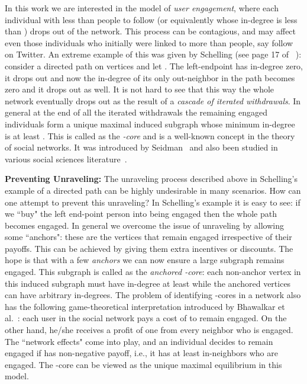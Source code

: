 \documentclass[11pt,a4paper]{article}
\begin{document}
In this work we are interested in the  model of \emph{user engagement}, where each individual with less than  people to
follow (or equivalently whose in-degree is less than ) drops out of the network. This
process can be contagious, and may affect even those individuals who initially were linked to more than  people, say follow
on Twitter. An extreme example of this was given by Schelling (see page 17 of ~\cite{schelling2006micromotives}): consider a
directed path on  vertices and let . The left-endpoint has in-degree zero, it drops out and now the in-degree of its
only out-neighbor in the path becomes zero and it drops out as well. It is not hard to see that this way the whole network
eventually drops out as the result of a \emph{cascade of iterated withdrawals}. In general at the end of all the iterated
withdrawals the remaining engaged individuals form a unique maximal induced subgraph whose minimum in-degree is at least .
This is called as the \emph{-core} and is a well-known concept in the theory of social networks. It was introduced by
Seidman~\cite{seidman-k-core} and also been studied in various social sciences
literature~\cite{chwe1999structure,chwe2000communication}.

\medskip
\noindent\textbf{Preventing Unraveling:} The unraveling process described above in Schelling's example of a directed path can
be  highly undesirable in many scenarios.  How can one attempt to prevent this unraveling? In Schelling's example it is easy
to see: if we ``buy" the left end-point person into being engaged then the whole path becomes engaged. In general we overcome
the issue of unraveling by allowing some ``anchors":  these are the vertices that remain engaged irrespective of their
payoffs. This can be achieved by giving them extra incentives or discounts. The hope is that with a few \emph{anchors} we can
now ensure a large subgraph remains engaged. This subgraph is  called as the \emph{anchored -core}: each non-anchor vertex
in this induced subgraph must have in-degree at least  while the anchored vertices can have arbitrary in-degrees. The
problem of identifying -cores in a network also has the following  game-theoretical interpretation   introduced by
Bhawalkar et al.~\cite{BhawalkarKLRS12}: each user in the social network pays a cost of  to remain engaged. On the other
hand, he/she receives a profit of one from every neighbor who is engaged. The ``network effects" come into play, and an
individual decides to remain engaged if has non-negative payoff, i.e., it has at least  in-neighbors who are engaged. The
-core can be viewed as the unique maximal equilibrium in this model.
\end{document}

